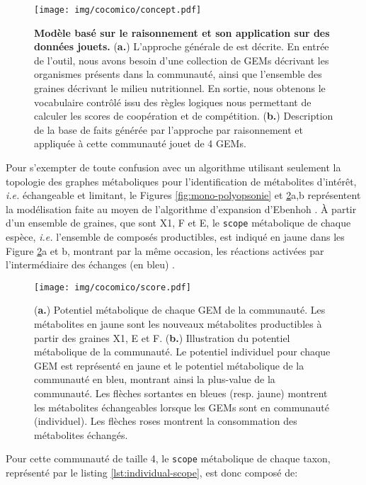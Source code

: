 \documentclass[../main.tex]{subfiles}
\begin{document}
\begin{figure}[H]
    \centering
    \texttt{[image: img/cocomico/concept.pdf]}
    \caption{\textbf{Modèle basé sur le raisonnement et son application sur des données jouets.}
     (\textbf{a.}) L'approche générale de \ccmc est décrite. En entrée de l'outil, nous avons besoin d'une collection de GEMs décrivant les organismes présents dans la communauté, ainsi que l'ensemble des graines décrivant le milieu nutritionnel. En sortie, nous obtenons le vocabulaire contrôlé issu des règles logiques nous permettant de calculer les scores de coopération et de compétition.
(\textbf{b.}) Description de la base de faits générée par l'approche par raisonnement et appliquée à cette communauté jouet de 4 GEMs.}
    \label{fig:concepts}
\end{figure}

Pour s'exempter de toute confusion avec un algorithme utilisant seulement la topologie des graphes métaboliques pour l'identification de métabolites d'intérêt, \textit{i.e.} échangeable et limitant, le Figures \ref{fig:mono-polyopsonie} et \ref{fig:scores}a,b représentent la modélisation faite au moyen de l'algorithme d'expansion d'Ebenhoh \citep{Ebenhoh2004}. À partir d'un ensemble de graines, que sont X1, F et E, le \texttt{scope} métabolique de chaque espèce, \textit{i.e.} l'ensemble de composés productibles, est indiqué en jaune dans les Figure \ref{fig:scores}a et b, montrant par la même occasion, les réactions activées par l'intermédiaire des échanges (en bleu) \citep{Frioux2018}. 

\begin{figure}[H]
    \centering
    \texttt{[image: img/cocomico/score.pdf]}
    \caption{  (\textbf{a.}) Potentiel métabolique de chaque GEM de la communauté. Les métabolites en jaune sont les nouveaux métabolites productibles à partir des graines X1, E et F. (\textbf{b.}) Illustration du potentiel métabolique de la communauté. Le potentiel individuel pour chaque GEM est représenté en jaune et le potentiel métabolique de la communauté en bleu, montrant ainsi la plus-value de la communauté. Les flèches sortantes en bleues (resp. jaune) montrent les métabolites échangeables lorsque les GEMs sont en communauté (individuel). Les flèches roses montrent la consommation des métabolites échangés.
    }
    \label{fig:scores}
\end{figure}

Pour cette communauté de taille 4, le \texttt{scope} métabolique de chaque taxon, représenté par le listing \ref{lst:individual-scope}, est donc composé de:
\end{document}
